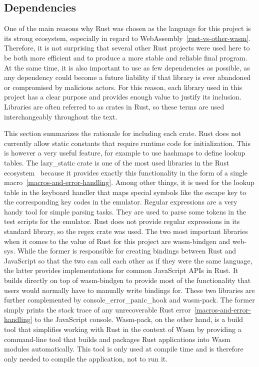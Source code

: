 \subsection{Dependencies}
\label{rust-deps}
One of the main reasons why Rust was chosen as the language for this project is its strong ecosystem, especially in regard to WebAssembly~\ref{rust-vs-other-wasm}.
Therefore, it is not surprising that several other Rust projects were used here to be both more efficient and to produce a more stable and reliable final program.
At the same time, it is also important to use as few dependencies as possible, as any dependency could become a future liability if that library is ever abandoned or compromised by malicious actors.
For this reason, each library used in this project has a clear purpose and provides enough value to justify its inclusion. Libraries are often referred to as crates in Rust, so these terms are used interchangeably throughout the text.

This section summarizes the rationale for including each crate.
Rust does not currently allow static constants that require runtime code for initialization. This is however a very useful feature, for example to use hashmaps to define lookup tables.
The lazy\_static crate is one of the most used libraries in the Rust ecosystem~\cite[Downloads all time]{lazystatic} because it provides exactly this functionality in the form of a single macro~\ref{macros-and-error-handling}. Among other things, it is used for the lookup table in the keyboard handler that maps special symbols like the escape key to the corresponding key codes in the emulator.
Regular expressions are a very handy tool for simple parsing tasks. They are used to parse some tokens in the test scripts for the emulator. Rust does not provide regular expressions in its standard library, so the regex crate was used.
\label{web-sys}
The two most important libraries when it comes to the value of Rust for this project are wasm-bindgen and web-sys.
While the former is responsible for creating bindings between Rust and JavaScript so that the two can call each other as if they were the same language, the latter provides implementations for common JavaScript APIs in Rust.
It builds directly on top of wasm-bindgen to provide most of the functionality that users would normally have to manually write bindings for.
These two libraries are further complemented by console\_error\_panic\_hook and wasm-pack.
The former simply prints the stack trace of any unrecoverable Rust error~\ref{macros-and-error-handling} to the JavaScript console.
Wasm-pack, on the other hand, is a build tool that simplifies working with Rust in the context of Wasm by providing a command-line tool that builds and packages Rust applications into Wasm modules automatically.
This tool is only used at compile time and is therefore only needed to compile the application, not to run it.

